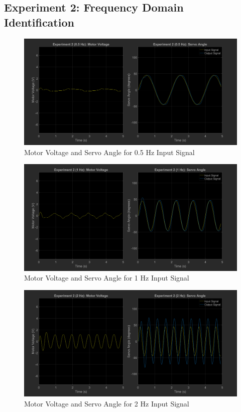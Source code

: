 \documentclass[12pt]{article}
\begin{document}
\subsection{Experiment 2: Frequency Domain Identification}
\begin{figure}[h!]
    \centering
    \includegraphics[width=\textwidth]{exp2_0.5}
    \caption{\label{fig:exp2_0.5}Motor Voltage and Servo Angle for 0.5 Hz Input Signal}
\end{figure}
\begin{figure}[h!]
    \centering
    \includegraphics[width=\textwidth]{exp2_1}
    \caption{\label{fig:exp2_0.5}Motor Voltage and Servo Angle for 1 Hz Input Signal}
\end{figure}
\begin{figure}[h!]
    \centering
    \includegraphics[width=\textwidth]{exp2_2}
    \caption{\label{fig:exp2_0.5}Motor Voltage and Servo Angle for 2 Hz Input Signal}
\end{figure}
\end{document}
